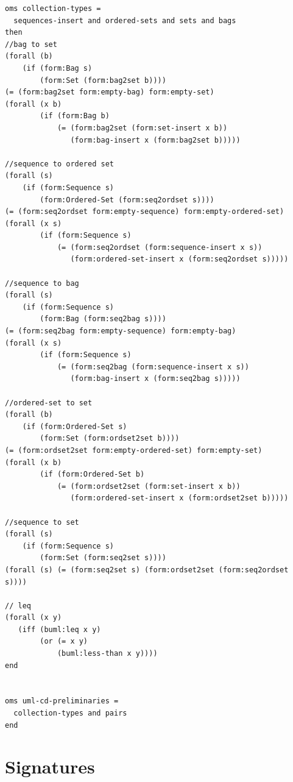 \documentclass[10pt,fleqn,final]{scrreprt}
\newenvironment{definitions}[0]{\medskip }{}
\begin{document}
\begin{definitions}
\begin{lstlisting}[language=clif,morekeywords={then,with,logic,oms,end},mathescape]
oms collection-types =
  sequences-insert and ordered-sets and sets and bags
then
//bag to set
(forall (b)
	(if (form:Bag s)
	    (form:Set (form:bag2set b))))
(= (form:bag2set form:empty-bag) form:empty-set)
(forall (x b)
        (if (form:Bag b)
            (= (form:bag2set (form:set-insert x b))
               (form:bag-insert x (form:bag2set b)))))

//sequence to ordered set
(forall (s)
	(if (form:Sequence s)
	    (form:Ordered-Set (form:seq2ordset s))))
(= (form:seq2ordset form:empty-sequence) form:empty-ordered-set)
(forall (x s)
        (if (form:Sequence s)
            (= (form:seq2ordset (form:sequence-insert x s))
               (form:ordered-set-insert x (form:seq2ordset s)))))

//sequence to bag
(forall (s)
	(if (form:Sequence s)
	    (form:Bag (form:seq2bag s))))
(= (form:seq2bag form:empty-sequence) form:empty-bag)
(forall (x s)
        (if (form:Sequence s)
            (= (form:seq2bag (form:sequence-insert x s))
               (form:bag-insert x (form:seq2bag s)))))

//ordered-set to set
(forall (b)
	(if (form:Ordered-Set s)
	    (form:Set (form:ordset2set b))))
(= (form:ordset2set form:empty-ordered-set) form:empty-set)
(forall (x b)
        (if (form:Ordered-Set b)
            (= (form:ordset2set (form:set-insert x b))
               (form:ordered-set-insert x (form:ordset2set b)))))

//sequence to set
(forall (s)
	(if (form:Sequence s)
	    (form:Set (form:seq2set s))))
(forall (s) (= (form:seq2set s) (form:ordset2set (form:seq2ordset s))))

// leq
(forall (x y)
   (iff (buml:leq x y)
        (or (= x y)
            (buml:less-than x y))))
end


oms uml-cd-preliminaries =
  collection-types and pairs
end

\end{lstlisting}


\section{Signatures}


\end{definitions}
\end{document}

